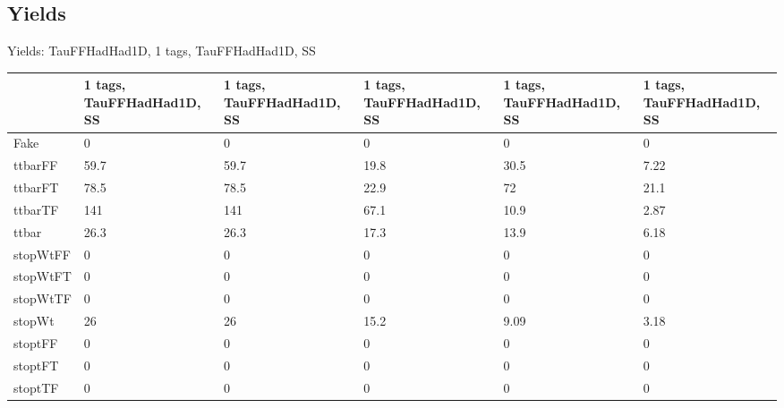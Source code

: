 
\subsection{Yields}

\begin{frame}{Yields: TauFFHadHad1D, 1 tags, TauFFHadHad1D, SS}
\begin{center}
  \begin{tabular}{l| >{\centering\let\newline\\\arraybackslash\hspace{0pt}}m{1.4cm}| >{\centering\let\newline\\\arraybackslash\hspace{0pt}}m{1.4cm}| >{\centering\let\newline\\\arraybackslash\hspace{0pt}}m{1.4cm}| >{\centering\let\newline\\\arraybackslash\hspace{0pt}}m{1.4cm}| >{\centering\let\newline\\\arraybackslash\hspace{0pt}}m{1.4cm}}
    & 1 tags, TauFFHadHad1D, SS & 1 tags, TauFFHadHad1D, SS & 1 tags, TauFFHadHad1D, SS & 1 tags, TauFFHadHad1D, SS & 1 tags, TauFFHadHad1D, SS \\
 \hline \hline
    Fake& 0 & 0 & 0 & 0 & 0 \\
 \hline
    ttbarFF& 59.7 & 59.7 & 19.8 & 30.5 & 7.22 \\
 \hline
    ttbarFT& 78.5 & 78.5 & 22.9 & 72 & 21.1 \\
 \hline
    ttbarTF& 141 & 141 & 67.1 & 10.9 & 2.87 \\
 \hline
    ttbar& 26.3 & 26.3 & 17.3 & 13.9 & 6.18 \\
 \hline
    stopWtFF& 0 & 0 & 0 & 0 & 0 \\
 \hline
    stopWtFT& 0 & 0 & 0 & 0 & 0 \\
 \hline
    stopWtTF& 0 & 0 & 0 & 0 & 0 \\
 \hline
    stopWt& 26 & 26 & 15.2 & 9.09 & 3.18 \\
 \hline
    stoptFF& 0 & 0 & 0 & 0 & 0 \\
 \hline
    stoptFT& 0 & 0 & 0 & 0 & 0 \\
 \hline
    stoptTF& 0 & 0 & 0 & 0 & 0 \\

\end{tabular}
\end{center}
\end{frame}
